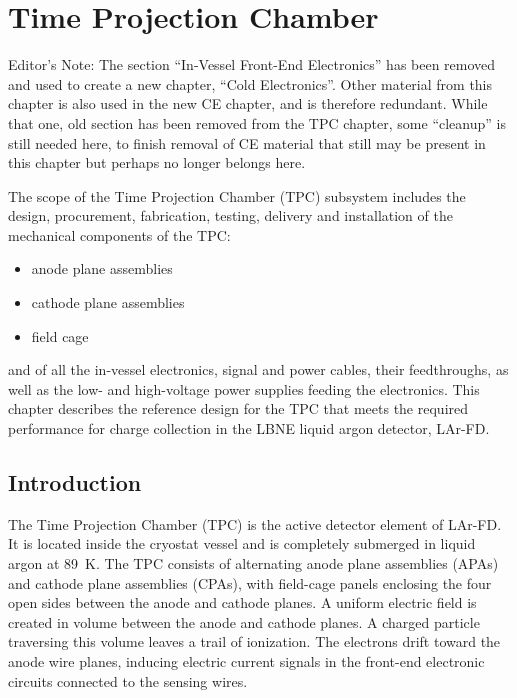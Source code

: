 \chapter{Time Projection Chamber }
\label{ch:tpc}

\begin{editornote}
  Editor's Note:  The section ``In-Vessel Front-End Electronics'' has been removed and used to create a new chapter,
``Cold Electronics''.
Other material from this chapter is also used in the new CE chapter, and is therefore redundant.
While that one, old section has been removed from the TPC chapter, some ``cleanup'' is still needed here,
to finish removal of CE material that still may be present in this chapter but perhaps no longer belongs here.
\end{editornote}


The scope of the Time Projection Chamber (TPC) subsystem includes the design, procurement, fabrication, testing, delivery and installation of the mechanical components of the TPC: 
\begin{itemize}
\item anode plane assemblies 
\item cathode plane assemblies
\item field cage
\end{itemize}
and of all the in-vessel electronics, signal and power cables, their feedthroughs, as well as the 
low- and high-voltage power supplies feeding the electronics.  This chapter describes the reference design for the TPC that meets the required performance for charge collection in the LBNE liquid argon detector, LAr-FD.

\section{Introduction}

The Time Projection Chamber (TPC) is the active detector element of LAr-FD. It is located inside the cryostat 
vessel and is completely submerged in liquid argon at 89~K. The TPC consists of alternating anode plane assemblies (APAs) and cathode plane assemblies (CPAs), with field-cage panels enclosing the four open sides between the anode and cathode planes.
A uniform electric field is created in volume between the anode and cathode planes. A charged particle traversing this volume leaves a trail of ionization.  The electrons drift toward the anode wire planes, inducing electric current signals in the front-end electronic circuits connected to the sensing wires.

